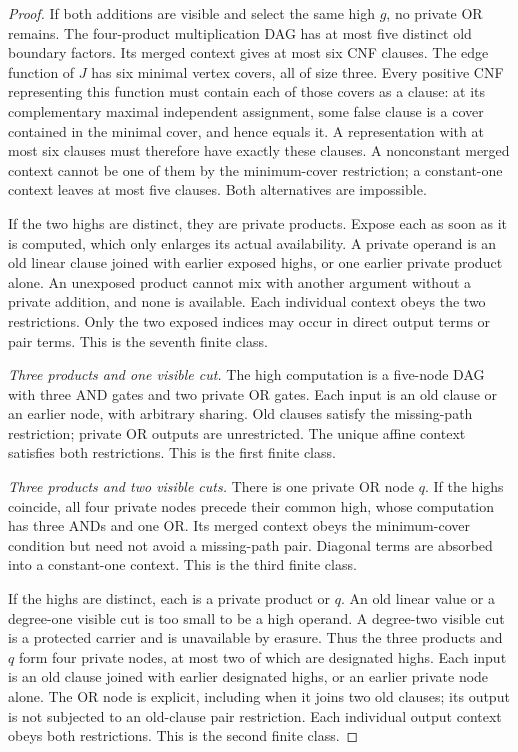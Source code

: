 \begin{proof}
If both additions are visible and select the same high $g$, no private
OR remains. The four-product multiplication DAG has at most five
distinct old boundary factors. Its merged context gives at most six
CNF clauses. The edge function of $J$ has six minimal vertex covers,
all of size three. Every positive CNF representing this function must
contain each of those covers as a clause: at its complementary maximal
independent assignment, some false clause is a cover contained in the
minimal cover, and hence equals it. A representation with at most six
clauses must therefore have exactly these clauses. A nonconstant
merged context cannot be one of them by the minimum-cover restriction;
a constant-one context leaves at most five clauses. Both alternatives
are impossible.

If the two highs are distinct, they are private products. Expose each
as soon as it is computed, which only enlarges its actual availability.
A private operand is an old linear clause joined with earlier exposed
highs, or one earlier private product alone. An unexposed product cannot
mix with another argument without a private addition, and none is
available. Each individual context obeys the two restrictions. Only
the two exposed indices may occur in direct output terms or pair
terms. This is the seventh finite class.

\emph{Three products and one visible cut.}
The high computation is a five-node DAG with three AND gates and two
private OR gates. Each input is an old clause or an earlier node, with
arbitrary sharing. Old clauses satisfy the missing-path restriction;
private OR outputs are unrestricted. The unique affine context
satisfies both restrictions. This is the first finite class.

\emph{Three products and two visible cuts.}
There is one private OR node $q$. If the highs coincide, all four
private nodes precede their common high, whose computation has three
ANDs and one OR. Its merged context obeys the minimum-cover condition
but need not avoid a missing-path pair. Diagonal terms are absorbed
into a constant-one context. This is the third finite class.

If the highs are distinct, each is a private product or $q$. An old
linear value or a degree-one visible cut is too small to be a high
operand. A degree-two visible cut is a protected carrier and is
unavailable by erasure. Thus the three products and $q$ form four
private nodes, at most two of which are designated highs. Each input
is an old clause joined with earlier designated highs, or an earlier
private node alone. The OR node is explicit, including when it joins
two old clauses; its output is not subjected to an old-clause pair
restriction. Each individual output context obeys both restrictions.
This is the second finite class.


\end{proof}
